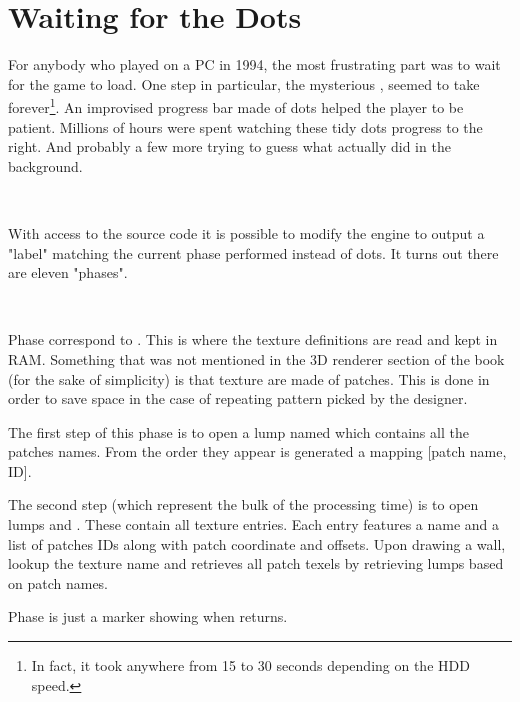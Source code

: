 \section{Waiting for the Dots}
\label{dots_explained}
For anybody who played \doom{} on a PC in 1994, the most frustrating part was to wait for the game to load. One step in particular, the mysterious ,  seemed to take forever\footnote{In fact, it took anywhere from 15 to 30 seconds depending on the HDD speed.}. An improvised progress bar made of dots helped the player to be patient. Millions of hours were spent watching these tidy dots progress to the right. And probably a few more trying to guess what  actually did in the background.\\
\par
{}\\
\par
With access to the source code it is possible to modify the engine to output a "label" matching the current phase performed instead of dots. It turns out there are eleven "phases".\\
\par
{}\\
\par

Phase  correspond to . This is where the texture definitions are read and kept in RAM. Something that was not mentioned in the 3D renderer section of the book (for the sake of simplicity) is that texture are made of patches. This is done in order to save space in the case of repeating pattern picked by the designer.\\
\par
The first step of this phase is to open a lump named  which contains all the patches names. From the order they appear is generated a mapping [patch name, ID].\\
\par
The second step (which represent the bulk of the processing time) is to open lumps  and . These contain all texture entries. Each entry features a name and a list of patches IDs along with patch coordinate and offsets. Upon drawing a wall, \doom{} lookup the texture name and retrieves all patch texels by retrieving lumps based on patch names.\\
\par
Phase  is just a marker showing when  returns.\\
\par

